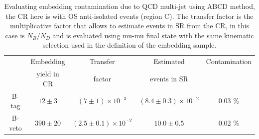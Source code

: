 \begin{table} [tp]
\centering
\begin{tabular}{c c c c c}
\hline
\hline
 & Embedding	& Transfer	& Estimated	& Contamination \\
 & yield in CR	& factor	& events in SR	&	\\		 [0.5ex]
\hline
B-tag  & $12 \pm 3$ & $ (7 \pm 1) \times 10^{-3}$ &  $(8.4 \pm 0.3) \times 10^{-2}$ &  0.03 \% \\
B-veto & $390 \pm 20$ & $(2.5 \pm 0.1) \times 10^{-2}$ & $10.0 \pm 0.5$ & 0.02 \% \\[1ex]
\hline
\end{tabular}
\caption{Evaluating embedding contamination due to QCD multi-jet using ABCD method, 
the CR here is with OS anti-isolated events (region C). The transfer factor is the
multiplicative factor that allows to estimate events in SR from the CR, in this case is $N_{B} / N_{D}$
and is evaluated using mu-mu final state with the same kinematic selection used in the 
definition of the embedding sample. }
\label{table:emb_cont_qcd}
\end{table}



